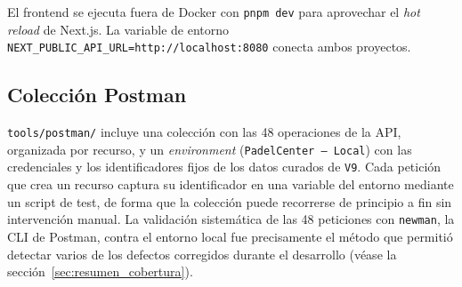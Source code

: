 El frontend se ejecuta fuera de Docker con \texttt{pnpm dev} para aprovechar
el \textit{hot reload} de Next.js. La variable de entorno
\texttt{NEXT\_PUBLIC\_API\_URL=http://localhost:8080} conecta ambos proyectos.

\subsection{Colección Postman}

\texttt{tools/postman/} incluye una colección con las 48 operaciones de la
API, organizada por recurso, y un \textit{environment} (\texttt{PadelCenter
— Local}) con las credenciales y los identificadores fijos de los datos
curados de \texttt{V9}. Cada petición que crea un recurso captura su
identificador en una variable del entorno mediante un script de test, de
forma que la colección puede recorrerse de principio a fin sin intervención
manual. La validación sistemática de las 48 peticiones con
\texttt{newman}, la CLI de Postman, contra el entorno local fue precisamente
el método que permitió detectar varios de los defectos corregidos durante
el desarrollo (véase la sección~\ref{sec:resumen_cobertura}).
